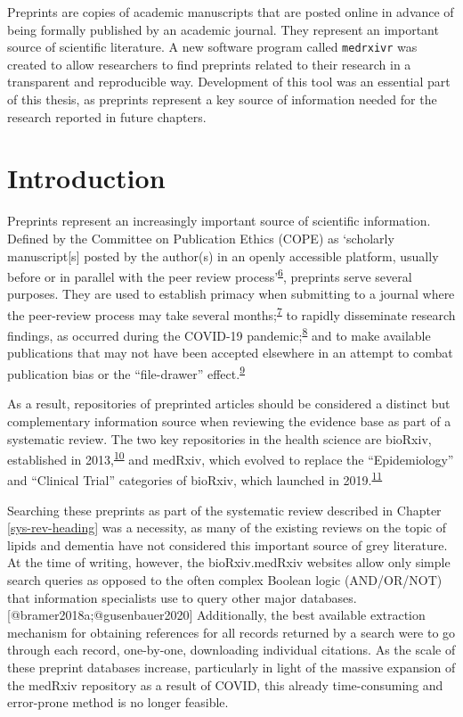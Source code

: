 \documentclass[a4paper, twoside]{templates/ociamthesis}
\begin{document}
Preprints are copies of academic manuscripts that are posted online in advance of being formally published by an academic journal. They represent an important source of scientific literature. A new software program called \texttt{medrxivr} was created to allow researchers to find preprints related to their research in a transparent and reproducible way. Development of this tool was an essential part of this thesis, as preprints represent a key source of information needed for the research reported in future chapters.

\hypertarget{introduction-1}{%
\section{Introduction}\label{introduction-1}}

Preprints represent an increasingly important source of scientific information. Defined by the Committee on Publication Ethics (COPE) as `scholarly manuscript{[}s{]} posted by the author(s) in an openly accessible platform, usually before or in parallel with the peer review process'\textsuperscript{\protect\hyperlink{ref-committeeonpublicationethicscope2018}{6}}, preprints serve several purposes. They are used to establish primacy when submitting to a journal where the peer-review process may take several months;\textsuperscript{\protect\hyperlink{ref-vale2016}{7}} to rapidly disseminate research findings, as occurred during the COVID-19 pandemic;\textsuperscript{\protect\hyperlink{ref-fraser2020a}{8}} and to make available publications that may not have been accepted elsewhere in an attempt to combat publication bias or the ``file-drawer'' effect.\textsuperscript{\protect\hyperlink{ref-rosenthal1979}{9}}

As a result, repositories of preprinted articles should be considered a distinct but complementary information source when reviewing the evidence base as part of a systematic review. The two key repositories in the health science are bioRxiv, established in 2013,\textsuperscript{\protect\hyperlink{ref-sever2019}{10}} and medRxiv, which evolved to replace the ``Epidemiology'' and ``Clinical Trial'' categories of bioRxiv, which launched in 2019.\textsuperscript{\protect\hyperlink{ref-rawlinson2019}{11}}

Searching these preprints as part of the systematic review described in Chapter \ref{sys-rev-heading} was a necessity, as many of the existing reviews on the topic of lipids and dementia have not considered this important source of grey literature. At the time of writing, however, the bioRxiv.medRxiv websites allow only simple search queries as opposed to the often complex Boolean logic (AND/OR/NOT) that information specialists use to query other major databases.{[}@bramer2018a;@gusenbauer2020{]} Additionally, the best available extraction mechanism for obtaining references for all records returned by a search were to go through each record, one-by-one, downloading individual citations. As the scale of these preprint databases increase, particularly in light of the massive expansion of the medRxiv repository as a result of COVID, this already time-consuming and error-prone method is no longer feasible.
\end{document}
